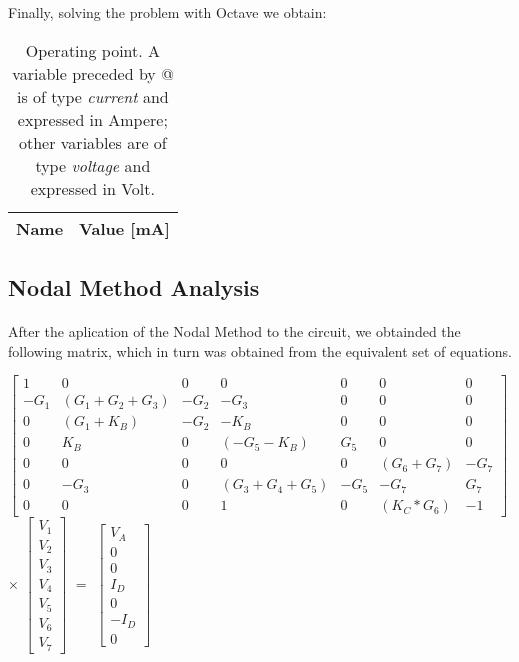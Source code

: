 Finally, solving the problem with Octave we obtain:

\begin{table}[h]
  \centering
  \begin{tabular}{|l|r|}
    \hline    
    {\bf Name} & {\bf Value [mA]} \\ \hline
    
  \end{tabular}
  \caption{Operating point. A variable preceded by @ is of type {\em current}
    and expressed in Ampere; other variables are of type {\it voltage} and expressed in
    Volt.}
  \label{tab:op}
\end{table}

\subsection{Nodal Method Analysis}

\paragraph{} After the aplication of the Nodal Method to the circuit, we obtainded the following matrix, which in turn was obtained from the equivalent set of equations.


$
\begin{bmatrix}
	1 & 0 & 0 & 0 & 0 & 0 & 0 \\
	-G_1 & (G_1 + G_2+G_3) & -G_2 & -G_3 & 0 & 0 & 0 \\
	0 & (G_1 + K_B) & -G_2 & -K_B & 0 & 0 & 0 \\
	0 & K_B & 0 & (-G_5 - K_B) & G_5 & 0 & 0 \\
	0 & 0 & 0 & 0 & 0 & (G_6 + G_7) & -G_7 \\
	0 & -G_3 & 0 & (G_3 + G_4 + G_5) & -G_5 & -G_7 & G_7 \\
	0 & 0 & 0 & 1 & 0 & (K_C * G_6) & -1
\end{bmatrix}
$
$\times$
$
\begin{bmatrix}
	V_1 \\
	V_2 \\
	V_3 \\
	V_4 \\
	V_5 \\
	V_6 \\
	V_7
\end{bmatrix}
$
$=$
$
\begin{bmatrix}
	V_A \\
	0 \\
	0 \\
	I_D \\
	0 \\
	-I_D \\
	0
\end{bmatrix}
$



